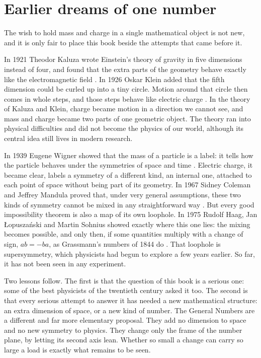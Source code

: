 \section*{Earlier dreams of one number}
{}

The wish to hold mass and charge in a single mathematical object is not new, and it is only fair to place this book beside the attempts that came before it.

In 1921 Theodor Kaluza wrote Einstein's theory of gravity in five dimensions instead of four, and found that the extra parts of the geometry behave exactly like the electromagnetic field \citep{Kaluza1921}. In 1926 Oskar Klein added that the fifth dimension could be curled up into a tiny circle. Motion around that circle then comes in whole steps, and those steps behave like electric charge \citep{Klein1926}. In the theory of Kaluza and Klein, charge became motion in a direction we cannot see, and mass and charge became two parts of one geometric object. The theory ran into physical difficulties and did not become the physics of our world, although its central idea still lives in modern research.

In 1939 Eugene Wigner showed that the mass of a particle is a label: it tells how the particle behaves under the symmetries of space and time \citep{Wigner1939}. Electric charge, it became clear, labels a symmetry of a different kind, an internal one, attached to each point of space without being part of its geometry. In 1967 Sidney Coleman and Jeffrey Mandula proved that, under very general assumptions, these two kinds of symmetry cannot be mixed in any straightforward way \citep{ColemanMandula1967}. But every good impossibility theorem is also a map of its own loophole. In 1975 Rudolf Haag, Jan {\L}opusza{\'n}ski and Martin Sohnius showed exactly where this one lies: the mixing becomes possible, and only then, if some quantities multiply with a change of sign, $ab = -ba$, as Grassmann's numbers of 1844 do \citep{HLS1975}. That loophole is supersymmetry, which physicists had begun to explore a few years earlier. So far, it has not been seen in any experiment.

Two lessons follow. The first is that the question of this book is a serious one: some of the best physicists of the twentieth century asked it too. The second is that every serious attempt to answer it has needed a new mathematical structure: an extra dimension of space, or a new kind of number. The General Numbers are a different and far more elementary proposal. They add no dimension to space and no new symmetry to physics. They change only the frame of the number plane, by letting its second axis lean. Whether so small a change can carry so large a load is exactly what remains to be seen.

